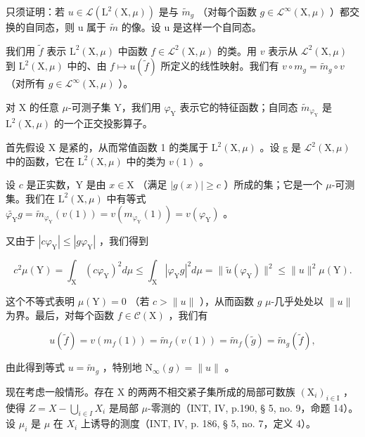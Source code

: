 只须证明：若 \(u \in \mathcal{L}(\mathrm{L}^{2}(\mathrm{X}, \mu))\) 是与 \(\widetilde{m}_{g}\) （对每个函数 \(g \in \mathcal{L}^{\infty}(\mathrm{X}, \mu)\) ）都交换的自同态，则 u 属于 \(\widetilde{m}\) 的像。设 u 是这样一个自同态。

我们用 \(\tilde{f}\) 表示 \(\mathrm{L}^2 (\mathrm{X},\mu)\) 中函数 \(f\in \mathcal{L}^2 (\mathrm{X},\mu)\) 的类。用 \(v\) 表示从 \(\mathcal{L}^2 (\mathrm{X},\mu)\) 到 \(\mathrm{L}^2 (\mathrm{X},\mu)\) 中的、由 \(f\mapsto u(\widetilde{f})\) 所定义的线性映射。我们有 \(v\circ m_g = \widetilde{m}_g\circ v\) （对所有 \(g\in \mathcal{L}^{\infty}(\mathrm{X},\mu)\) ）。

对 X 的任意 \(\mu\)-可测子集 Y，我们用 \(\varphi_{\mathrm{Y}}\) 表示它的特征函数；自同态 \(\widetilde{m}_{\varphi_{\mathrm{Y}}}\) 是 \(\mathrm{L}^2 (\mathrm{X},\mu)\) 的一个正交投影算子。

首先假设 X 是紧的，从而常值函数 1 的类属于 \(\mathrm{L}^{2}(\mathrm{X},\mu)\) 。设 g 是 \(\mathcal{L}^{2}(\mathrm{X},\mu)\) 中的函数，它在 \(\mathrm{L}^{2}(\mathrm{X},\mu)\) 中的类为 \(v(1)\) 。

设 \(c\) 是正实数，Y 是由 \(x \in \mathrm{X}\) （满足 \(|g(x)| \geqslant c\) ）所成的集；它是一个 \(\mu\)-可测集。我们在 \(\mathrm{L}^2(\mathrm{X}, \mu)\) 中有等式 \(\widetilde{\varphi_{\mathrm{Y}}} g = \widetilde{m}_{\varphi_{\mathrm{Y}}}(v(1)) = v(m_{\varphi_{\mathrm{Y}}}(1)) = v(\varphi_{\mathrm{Y}})\) 。

又由于 \(|c\varphi_{\mathrm{Y}}| \leqslant |g\varphi_{\mathrm{Y}}|\) ，我们得到

\[
c ^ {2} \mu (\mathrm{Y}) = \int_ {\mathrm{X}} (c \varphi_ {\mathrm{Y}}) ^ {2} d \mu \leqslant \int_ {\mathrm{X}} | \varphi_ {\mathrm{Y}} g | ^ {2} d \mu = \| \widetilde {u} (\varphi_ {\mathrm{Y}}) \| ^ {2} \leqslant \| u \| ^ {2} \mu (\mathrm{Y}).
\]

这个不等式表明 \(\mu(\mathrm{Y}) = 0\) （若 \(c > \|u\|\) ），从而函数 \(g\) \(\mu\)-几乎处处以 \(\|u\|\) 为界。最后，对每个函数 \(f \in \mathcal{C}(\mathrm{X})\) ，我们有

\[
u (\widetilde {f}) = v (m _ {f} (1)) = \widetilde {m} _ {f} (v (1)) = \widetilde {m} _ {f} (\widetilde {g}) = \widetilde {m} _ {g} (\widetilde {f}),
\]

由此得到等式 \(u = \tilde{m}_{g}\) ，特别地 \(\mathrm{N}_{\infty}(g) = \| u\|\) 。

现在考虑一般情形。存在 X 的两两不相交紧子集所成的局部可数族 \((\mathrm{X}_{i})_{i\in\mathrm{I}}\) ，使得 \(Z = X - \bigcup_{i \in I} X_i\) 是局部 \(\mu\)-零测的（INT, IV, p.190, § 5, no. 9，命题 14）。设 \(\mu_i\) 是 \(\mu\) 在 \(X_i\) 上诱导的测度（INT, IV, p. 186, § 5, no. 7，定义 4）。

